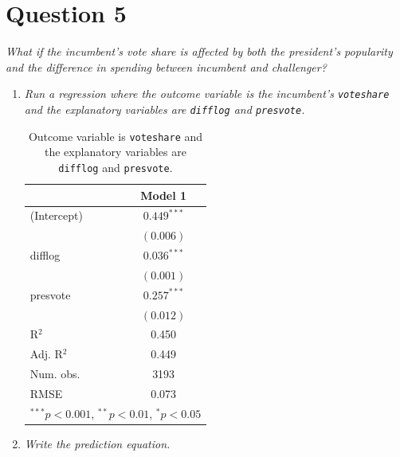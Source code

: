 \documentclass[12pt,letterpaper]{article}
\begin{document}
	\section*{Question 5}%
	\noindent \emph{What if the incumbent's vote share is affected by both the president's popularity and the difference in spending between incumbent and challenger? }
	\begin{enumerate}
		\item \emph{Run a regression where the outcome variable is the incumbent's \texttt{voteshare} and the explanatory variables are \texttt{difflog} and \texttt{presvote}.}	\vspace{.25cm}
		
				
					
				\begin{table}[h!]
					\begin{center}
						\caption{\footnotesize{Outcome variable is \texttt{voteshare} and the explanatory variables are  \texttt{difflog} and \texttt{presvote}.}} %
						\begin{tabular}{l c }
							\hline
							& Model 1 \\
							\hline		
						(Intercept) & $0.449^{***}$ \\
            & $(0.006)$     \\
difflog     & $0.036^{***}$ \\
            & $(0.001)$     \\
presvote    & $0.257^{***}$ \\
            & $(0.012)$     \\
\hline
R$^2$       & 0.450         \\
Adj. R$^2$  & 0.449         \\
Num. obs.   & 3193          \\
RMSE        & 0.073         \\
							\hline
							\multicolumn{2}{l}{\scriptsize{$^{***}p<0.001$, $^{**}p<0.01$, $^*p<0.05$}}
						\end{tabular}
						
					\end{center}
				\end{table}
				
				\vspace{.25cm}
		\item \emph{Write the prediction equation.}	\vspace{.25cm}
		

\end{enumerate}
\end{document}
